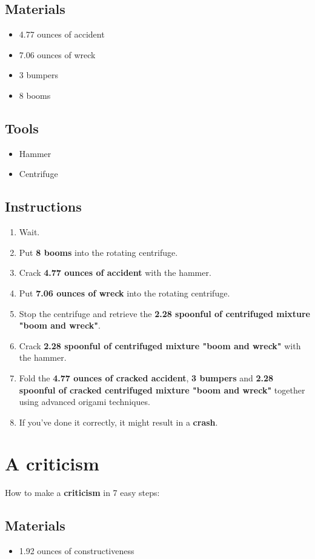 \documentclass{article}
\begin{document}
\subsection{Materials}\begin{itemize}
\item 
4.77 ounces of accident
\item 
7.06 ounces of wreck
\item 
3 bumpers
\item 
8 booms
\end{itemize}
\subsection{Tools}\begin{itemize}
\item 
Hammer
\item 
Centrifuge
\end{itemize}
\subsection{Instructions}\begin{enumerate}
\item 
Wait.
\item 
Put \textbf{8 booms} into the rotating centrifuge.
\item 
Crack \textbf{4.77 ounces of accident} with the hammer.
\item 
Put \textbf{7.06 ounces of wreck} into the rotating centrifuge.
\item 
Stop the centrifuge and retrieve the \textbf{2.28 spoonful of centrifuged mixture "boom and wreck"}.
\item 
Crack \textbf{2.28 spoonful of centrifuged mixture "boom and wreck"} with the hammer.
\item 
Fold the \textbf{4.77 ounces of cracked accident}, \textbf{3 bumpers} and \textbf{2.28 spoonful of cracked centrifuged mixture "boom and wreck"} together using advanced origami techniques.
\item 
If you've done it correctly, it might result in a \textbf{crash}.
\end{enumerate}
\newpage
\section{A criticism}How to make a \textbf{criticism} in 7 easy steps:

\subsection{Materials}\begin{itemize}
\item 
1.92 ounces of constructiveness
\end{itemize}
\end{document}
